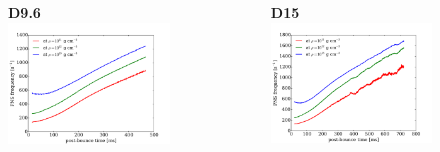 \documentclass[aspectratio=169]{beamer}
\begin{document}
\begin{frame}

  \begin{columns}[c]

      \begin{figure}
        \textbf{D9.6}
        \includegraphics[width=1.0\textwidth]{Figures/D9.6_peakFrequency.pdf}
      \end{figure}

      \begin{figure}
        \textbf{D15}
        \includegraphics[width=1.0\textwidth]{Figures/D15_peakFrequency.pdf}
      \end{figure}


\end{columns}
\end{frame}
\end{document}
